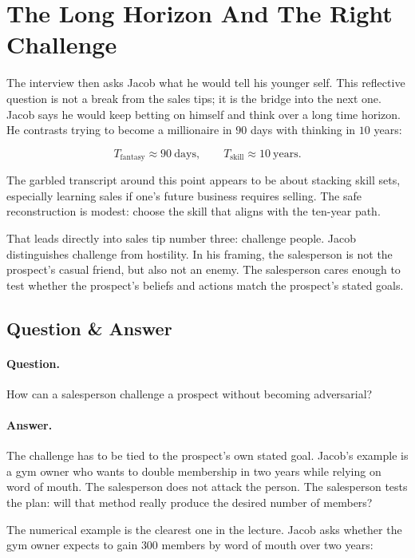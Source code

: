 \section{The Long Horizon And The Right Challenge}

The interview then asks Jacob what he would tell his younger self. This reflective question is not a break from the sales tips; it is the bridge into the next one. Jacob says he would keep betting on himself and think over a long time horizon. He contrasts trying to become a millionaire in \(90\) days with thinking in \(10\) years:

\begin{equation}
T_{\mathrm{fantasy}} \approx 90\ \mathrm{days},
\qquad
T_{\mathrm{skill}} \approx 10\ \mathrm{years}.
\end{equation}

The garbled transcript around this point appears to be about stacking skill sets, especially learning sales if one's future business requires selling. The safe reconstruction is modest: choose the skill that aligns with the ten-year path.

That leads directly into sales tip number three: challenge people. Jacob distinguishes challenge from hostility. In his framing, the salesperson is not the prospect's casual friend, but also not an enemy. The salesperson cares enough to test whether the prospect's beliefs and actions match the prospect's stated goals.

\subsection{Question \& Answer}

\paragraph{Question.}
How can a salesperson challenge a prospect without becoming adversarial?

\paragraph{Answer.}
The challenge has to be tied to the prospect's own stated goal. Jacob's example is a gym owner who wants to double membership in two years while relying on word of mouth. The salesperson does not attack the person. The salesperson tests the plan: will that method really produce the desired number of members?

The numerical example is the clearest one in the lecture. Jacob asks whether the gym owner expects to gain \(300\) members by word of mouth over two years:


